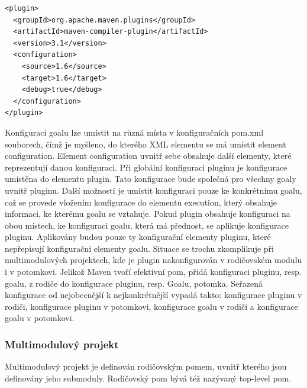\documentclass[11pt,twoside,a4paper]{book}
\begin{document}
\begin{lstlisting}[frame=single]
<plugin>
  <groupId>org.apache.maven.plugins</groupId>
  <artifactId>maven-compiler-plugin</artifactId>
  <version>3.1</version>
  <configuration>
    <source>1.6</source>
    <target>1.6</target>
    <debug>true</debug>
  </configuration>
</plugin>
\end{lstlisting}

Konfiguraci goalu lze umístit na různá místa v konfiguračních pom.xml souborech, čímž je
myšleno, do kterého XML elementu se má umístit element configuration. Element
configuration uvnitř sebe obsahuje další elementy, které reprezentují danou konfiguraci. Při
globální konfiguraci pluginu je konfigurace umístěna do elementu plugin. Tato konfigurace
bude společná pro všechny goaly uvnitř pluginu. Další možností je umístit konfiguraci pouze
ke konkrétnímu goalu, což se provede vložením konfigurace do elementu execution, který
obsahuje informaci, ke kterému goalu se vztahuje. Pokud plugin obsahuje konfiguraci na
obou místech, ke konfiguraci goalu, která má přednost, se aplikuje konfigurace pluginu.
Aplikovány budou pouze ty konfigurační elementy pluginu, které nepřepisují konfigurační
elementy goalu. Situace se trochu zkomplikuje při multimodulových projektech, kde je plugin
nakonfigurován v rodičovském modulu i v potomkovi. Jelikož Maven tvoří efektivní pom,
přidá konfiguraci pluginu, resp. goalu, z rodiče do konfigurace pluginu, resp. Goalu, potomka.
Seřazená konfigurace od nejobecnější k nejkonkrétnější vypadá takto: konfigurace pluginu v
rodiči, konfigurace pluginu v potomkovi, konfigurace goalu v rodiči a konfigurace goalu v
potomkovi.

\subsubsection{Multimodulový projekt}

Multimodulový projekt je definován rodičovským pomem, uvnitř kterého jsou definovány
jeho submoduly. Rodičovský pom bývá též nazývaný top-level pom.
\end{document}
